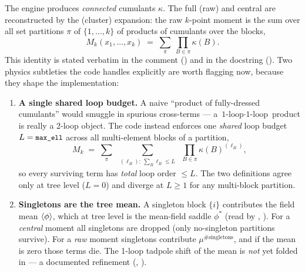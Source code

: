The engine produces \emph{connected} cumulants $\kappa$. The full (raw) and
central  are reconstructed by the  (cluster)
expansion: the raw $k$-point moment is the sum over all set partitions $\pi$ of
$\{1,\ldots,k\}$ of products of cumulants over the blocks,
\begin{equation}
  M_k(x_1,\ldots,x_k) \;=\; \sum_{\pi}\ \prod_{B\in\pi} \kappa(B).
  \label{eq:setpart}
\end{equation}
This identity is stated verbatim in the  comment
() and in the
 docstring
(). Two physics subtleties the code handles
explicitly are worth flagging now, because they shape the implementation:

\begin{enumerate}
  \item \textbf{A single shared loop budget.} A naive ``product of fully-dressed
        cumulants'' would smuggle in spurious cross-terms --- a
        $\text{1-loop}\cdot\text{1-loop}$ product is really a 2-loop object. The
        code instead enforces one \emph{shared} loop budget $L=\texttt{\small max\_ell}$
        across all multi-element blocks of a partition,
        \begin{equation}
          M_k \;=\; \sum_\pi \;
            \sum_{\substack{(\ell_B):\ \sum_B \ell_B \le L}}\;
            \prod_{B\in\pi} \kappa(B)^{(\ell_B)},
          \label{eq:sharedbudget}
        \end{equation}
        so every surviving term has \emph{total} loop order $\le L$. The two
        definitions agree only at tree level ($L=0$) and diverge at $L\ge 1$ for
        any multi-block partition.
  \item \textbf{Singletons are the tree mean.} A singleton block $\{i\}$
        contributes the field mean $\left\langle \phi \right\rangle$, which at tree level is the
        mean-field saddle $\phi^{*}$ (read by ,
        ). For a \emph{central} moment all
        singletons are dropped (only no-singleton partitions survive). For a
        \emph{raw} moment singletons contribute $\mu^{\#\text{singletons}}$, and
        if the mean is zero those terms die. The 1-loop tadpole shift of the mean
        is \emph{not} yet folded in --- a documented refinement
        (, ).
\end{enumerate}

